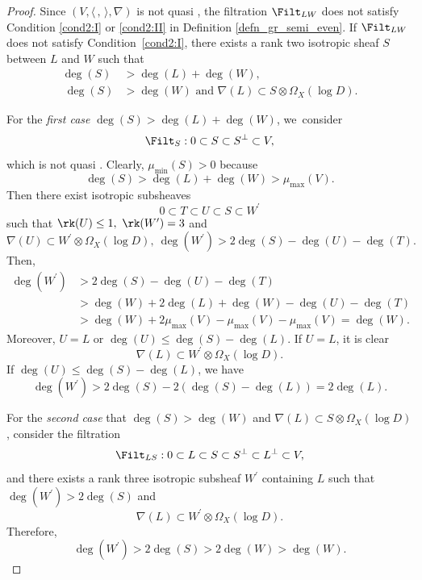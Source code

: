 \begin{proof}
Since $(V,\langle \,, \, \rangle,\nabla)$ is not quasi \grsemistable, the filtration $\Filt_{LW}$ does not satisfy Condition \eqref{cond2:I} or \eqref{cond2:II} in Definition \ref{defn_gr_semi_even}. If $\Filt_{LW}$ does not satisfy Condition~\eqref{cond2:I}, there exists a rank two isotropic sheaf $S$ between $L$ and $W$ such that
\begin{align*}
\deg(S)&>\deg(L)+\deg(W),
\\\
\tag*{or}
\deg(S)&>\deg(W) \text{ and } \nabla(L)\subset S\otimes\Omega_X(\log D).
\end{align*}

For the \emph{first case} $\deg(S)>\deg(L)+\deg(W)$, we~consider
\[
\Filt_S:0\subset S\subset S^\perp\subset V,
\]
which is not quasi \grsemistable. Clearly, $\mu_{\min}(S)>0 $ because
\[
\deg(S)>\deg(L)+\deg(W)>\mu_{\max}(V).
\]
Then there exist isotropic subsheaves
\[
0\subset T\subset U\subset S\subset W^\prime 
\]
such that $\rk(U)\leq1,\ \rk(W^\prime)=3$ and
\[
\nabla(U )\subset W^\prime\otimes\Omega_X(\log D),\ \deg(W^\prime)>2\deg(S)-\deg(U)-\deg(T).
\]
Then,
\begin{equation*}
\begin{split}
\deg(W^\prime)&> 2\deg(S)-\deg(U)-\deg(T)\\
&>\deg(W)+2\deg(L)+\deg(W)-\deg(U)-\deg(T)\\
&>\deg(W)+2\mu_{\max}(V)-\mu_{\max}(V)-\mu_{\max}(V)=\deg(W).
\end{split}
\end{equation*}
Moreover, $U=L$ or $\deg(U)\leq \deg(S)-\deg(L)$. If $U=L$, it is clear
\[
\nabla(L)\subset W^\prime\otimes\Omega_X(\log D).
\]
If $\deg(U)\leq \deg(S)-\deg(L)$, we have
\[
\deg(W^\prime)>2\deg(S)-2(\deg(S)-\deg(L))=2\deg(L).
\]

For the \emph{second case} that $\deg(S)>\deg(W)$ and $\nabla(L)\subset S\otimes\Omega_X(\log D)$, consider the filtration
\[
\Filt_{LS}:0\subset L\subset S\subset S^\perp\subset L^\perp\subset V,
\]
and there exists a rank three isotropic subsheaf $W^\prime$ containing $L$ such that $\deg(W^\prime)>2\deg(S)$ and
\[
\nabla(L)\subset W^\prime\otimes\Omega_X(\log D).
\]
Therefore,
\[
\deg(W^\prime)>2\deg(S)>2\deg(W)>\deg(W).
\]


\end{proof}
